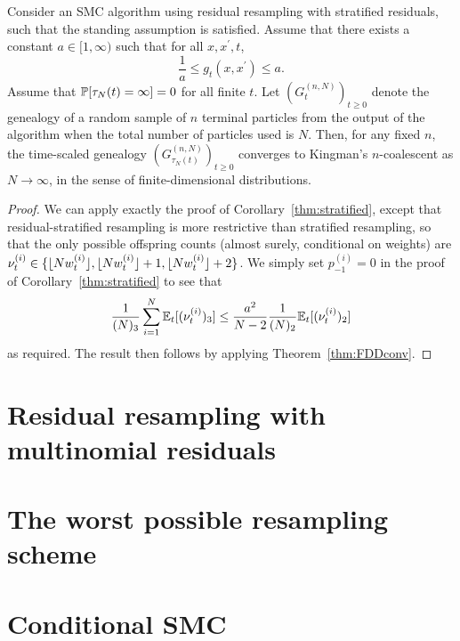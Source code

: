 \begin{corollary}\label{thm:residual_stratified}
Consider an SMC algorithm using residual resampling with stratified residuals, such that the standing assumption is satisfied.
Assume that there exists a constant $a\in [1,\infty)$ such that for all $x, x^\prime, t$,
\begin{equation}
\frac{1}{a} \leq g_t(x, x^\prime) \leq a .
\end{equation}
Assume that $\mathbb{P}[ \tau_N(t) = \infty] =0$ for all finite $t$.
Let $(G_t^{(n,N)})_{t\geq0}$ denote the genealogy of a random sample of $n$ terminal particles from the output of the algorithm when the total number of particles used is $N$. Then, for any fixed $n$, the time-scaled genealogy $(G_{\tau_N(t)}^{(n,N)})_{t\geq0}$ converges to Kingman's $n$-coalescent as $N\to \infty$, in the sense of finite-dimensional distributions.
\end{corollary}

\begin{proof}
We can apply exactly the proof of Corollary~\ref{thm:stratified}, except that residual-stratified resampling is more restrictive than stratified resampling, so that the only possible offspring counts (almost surely, conditional on weights) are $\nu_t^{(i)} \in \{ \lfloor N w_t^{(i)} \rfloor, \lfloor N w_t^{(i)} \rfloor +1, \lfloor N w_t^{(i)} \rfloor +2 \}$. We simply set $p_{-1}^{(i)} = 0$ in the proof of Corollary~\ref{thm:stratified} to see that
\begin{equation*}
\frac{1}{(N)_3} \sum_{i=1}^{N} \mathbb{E}_t [(\nu_t^{(i)})_3 ]
\leq \frac{a^2}{N-2} \frac{1}{(N)_2} \mathbb{E}_t [(\nu_t^{(i)})_2 ]
\end{equation*}
as required.
The result then follows by applying Theorem~\ref{thm:FDDconv}.
\end{proof}


\section{Residual resampling with multinomial residuals}

\section{The worst possible resampling scheme}


\section{Conditional SMC}


